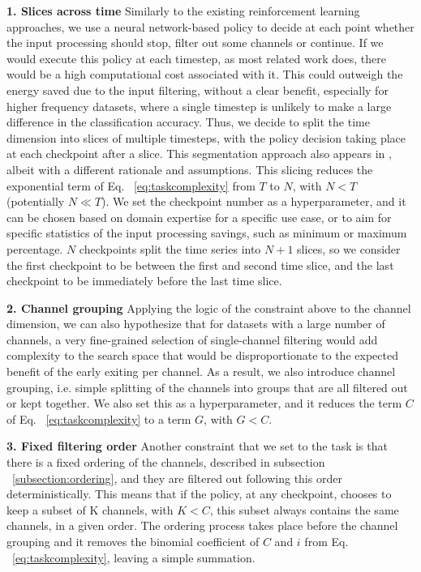 \documentclass[conference]{IEEEtran}
\begin{document}
\textbf{1. Slices across time} Similarly to the existing reinforcement learning approaches, we use a neural network-based policy to decide at each point whether the input processing should stop, filter out some channels or continue. If we would execute this policy at each timestep, as most related work does, there would be a high computational cost associated with it. This could outweigh the energy saved due to the input filtering, without a clear benefit, especially for higher frequency datasets, where a single timestep is unlikely to make a large difference in the classification accuracy. Thus, we decide to split the time dimension into slices of multiple timesteps, with the policy decision taking place at each checkpoint after a slice. This segmentation approach also appears in \cite{li2014early}, albeit with a different rationale and assumptions. This slicing reduces the exponential term of Eq. ~\ref{eq:taskcomplexity} from $T$ to $N$, with $N < T$ (potentially $N \ll T$). We set the checkpoint number as a hyperparameter, and it can be chosen based on domain expertise for a specific use case, or to aim for specific statistics of the input processing savings, such as minimum or maximum percentage. $N$ checkpoints split the time series into $N+1$ slices, so we consider the first checkpoint to be between the first and second time slice, and the last checkpoint to be immediately before the last time slice.

\textbf{2. Channel grouping} Applying the logic of the constraint above to the channel dimension, we can also hypothesize that for datasets with a large number of channels, a very fine-grained selection of single-channel filtering would add complexity to the search space that would be disproportionate to the expected benefit of the early exiting per channel. As a result, we also introduce channel grouping, i.e. simple splitting of the channels into groups that are all filtered out or kept together. We also set this as a hyperparameter, and it reduces the term $C$ of Eq. ~\ref{eq:taskcomplexity} to a term $G$, with $G < C$.

\textbf{3. Fixed filtering order} Another constraint that we set to the task is that there is a fixed ordering of the channels, described in subsection ~\ref{subsection:ordering}, and they are filtered out following this order deterministically. This means that if the policy, at any checkpoint, chooses to keep a subset of K channels, with $K<C$, this subset always contains the same channels, in a given order. The ordering process takes place before the channel grouping and it removes the binomial coefficient of $C$ and $i$ from Eq. ~\ref{eq:taskcomplexity}, leaving a simple summation.
\end{document}
